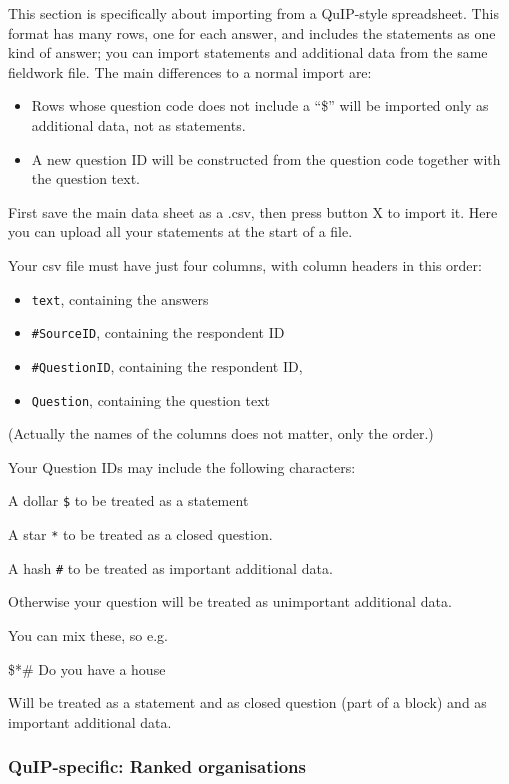 \documentclass[
]{book}
\providecommand{\tightlist}{%
  \setlength{\itemsep}{0pt}\setlength{\parskip}{0pt}}
\begin{document}
This section is specifically about importing from a QuIP-style spreadsheet. This format has many rows, one for each answer, and includes the statements as one kind of answer; you can import statements and additional data from the same fieldwork file. The main differences to a normal import are:

\begin{itemize}
\tightlist
\item
  Rows whose question code does not include a ``\$'' will be imported only as additional data, not as statements.
\item
  A new question ID will be constructed from the question code together with the question text.
\end{itemize}

First save the main data sheet as a .csv, then press button X to import it.
Here you can upload all your statements at the start of a file.

Your csv file must have just four columns, with column headers in this order:

\begin{itemize}
\tightlist
\item
  \texttt{text}, containing the answers
\item
  \texttt{\#SourceID}, containing the respondent ID
\item
  \texttt{\#QuestionID}, containing the respondent ID,
\item
  \texttt{Question}, containing the question text
\end{itemize}

(Actually the names of the columns does not matter, only the order.)

Your Question IDs may include the following characters:

A dollar \texttt{\$} to be treated as a statement

A star \texttt{*} to be treated as a closed question.

A hash \texttt{\#} to be treated as important additional data.

Otherwise your question will be treated as unimportant additional data.

You can mix these, so e.g.

\$*\# Do you have a house

Will be treated as a statement and as closed question (part of a block) and as important additional data.

\hypertarget{quip-specific-ranked-organisations}{%
\subsubsection{QuIP-specific: Ranked organisations}\label{quip-specific-ranked-organisations}}
\end{document}
